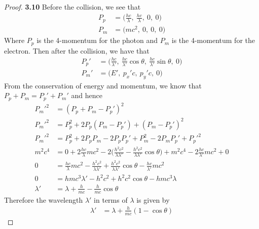 \documentclass[11pt]{article}
\theoremstyle{definition}
\begin{document}
\begin{proof}{\textbf{3.10}}
    Before the collision, we see that
    \begin{align*}
        P_p &=\bigg(\frac{hc}{\lambda}, ~\frac{hc}{\lambda},~ 0,~0\bigg)\\
        P_m &= \bigg(mc^2,~0,~0,~0\bigg)
    \end{align*}
    Where $P_p$ is the 4-momentum for the photon and $P_m$ is the 4-momentum
    for the electron.
    Then after the collision, we have that
    \begin{align*}
        P_p' &=\bigg(\frac{hc}{\lambda'}, ~\frac{hc}{\lambda'}\cos\theta,
        ~\frac{hc}{\lambda'}\sin\theta,~0\bigg)\\
        P_m' &= \bigg(E',~p_x'c,~p_y'c,~0\bigg)
    \end{align*}
    From the conservation of energy and momentum, we know that
    $P_p + P_m = P_p' + P_m'$ and hence
    \begin{align*}
        P_m'^2 &= (P_p + P_m - P_p')^2\\
        P_m'^2 &= P_p^2 + 2P_p(P_m - P_p') + (P_m - P_p')^2\\
        P_m'^2 &= P_p^2 + 2P_pP_m - 2P_pP_p' + P_m^2 - 2P_mP_p' + P_p'^2\\
        m^2c^4 &= 0 + 2\frac{hc}{\lambda}mc^2 - 2\bigg(\frac{h^2c^2}{\lambda\lambda'}
        - \frac{h^2c^2}{\lambda\lambda'}\cos\theta\bigg) + m^2c^4
        - 2\frac{hc}{\lambda'}mc^2 + 0\\
        0 &= \frac{hc}{\lambda}mc^2 - \frac{h^2c^2}{\lambda\lambda'}
        + \frac{h^2c^2}{\lambda\lambda'}\cos\theta
        - \frac{hc}{\lambda'}mc^2 \\
        0 &= hmc^3\lambda' - h^2c^2 + h^2c^2\cos\theta - hmc^3\lambda\\
        \lambda' &= \lambda + \frac{h}{mc} - \frac{h}{mc}\cos\theta
    \end{align*}
    Therefore the wavelength $\lambda'$ in terms of $\lambda$ is given by
    \begin{align*}
        \lambda' &= \lambda + \frac{h}{mc}(1 - \cos\theta)
    \end{align*}
\end{proof}
\cleardoublepage
\end{document}
